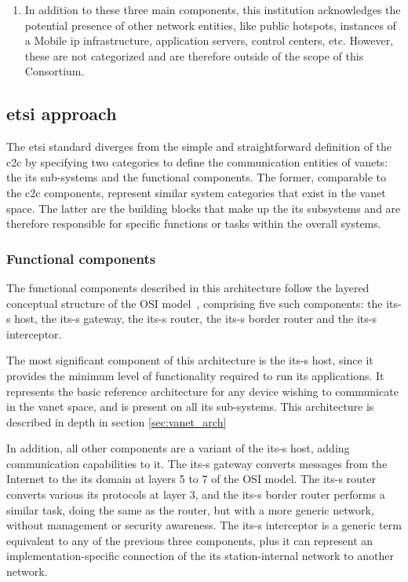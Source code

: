 \begin{enumerate}
    \item In addition to these three main components, this institution acknowledges the potential presence of other network entities, like public hotspots, instances of a Mobile \gls{ip} infrastructure, application servers, control centers, etc. However, these are not categorized and are therefore outside of the scope of this Consortium.

\end{enumerate}

\subsection[ETSI approach]{\gls{etsi} approach}

The \gls{etsi} standard diverges from the simple and straightforward definition of the \gls{c2c} by specifying two categories to define the communication entities of \glspl{vanet}: the \gls{its} sub-systems and the functional components. The former, comparable to the \gls{c2c} components, represent similar system categories that exist in the \gls{vanet} space. The latter are the building blocks that make up the \gls{its} subsystems and are therefore responsible for specific functions or tasks within the overall systems.

\subsubsection{Functional components}

The functional components described in this architecture follow the layered conceptual structure of the OSI model~\cite{etsi_intelligent_2010}, comprising five such components: the \gls{its-s} host, the \gls{its-s} gateway, the \gls{its-s} router, the \gls{its-s} border router and the \gls{its-s} interceptor.

The most significant component of this architecture is the \gls{its-s} host, since it provides the minimum level of functionality required to run \gls{its} applications. It represents the basic reference architecture for any device wishing to communicate in the \gls{vanet} space, and is present on all \gls{its} sub-systems. This architecture is described in depth in section \ref{sec:vanet_arch} 

In addition, all other components are a variant of the \gls{its-s} host, adding communication capabilities to it. The \gls{its-s} gateway converts messages from the Internet to the \gls{its} domain at layers 5 to 7 of the OSI model. The \gls{its-s} router converts various \gls{its} protocols at layer 3, and the \gls{its-s} border router performs a similar task, doing the same as the router, but with a more generic network, without management or security awareness. The \gls{its-s} interceptor is a generic term equivalent to any of the previous three components, plus it can represent an implementation-specific connection of the \gls{its} station-internal network to another network.

